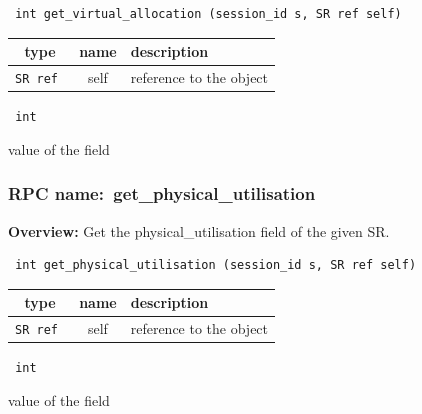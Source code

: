 \begin{verbatim} int get_virtual_allocation (session_id s, SR ref self)\end{verbatim}



 
\vspace{0.3cm}
\begin{tabular}{|c|c|p{7cm}|}
 \hline
{\bf type} & {\bf name} & {\bf description} \\ \hline
{\tt SR ref } & self & reference to the object \\ \hline 

\end{tabular}

\vspace{0.3cm}

{\tt 
int
}


value of the field
\vspace{0.3cm}
\vspace{0.3cm}
\vspace{0.3cm}
\subsubsection{RPC name:~get\_physical\_utilisation}

{\bf Overview:} 
Get the physical\_utilisation field of the given SR.

\begin{verbatim} int get_physical_utilisation (session_id s, SR ref self)\end{verbatim}



 
\vspace{0.3cm}
\begin{tabular}{|c|c|p{7cm}|}
 \hline
{\bf type} & {\bf name} & {\bf description} \\ \hline
{\tt SR ref } & self & reference to the object \\ \hline 

\end{tabular}

\vspace{0.3cm}

{\tt 
int
}


value of the field
\vspace{0.3cm}
\vspace{0.3cm}
\vspace{0.3cm}
